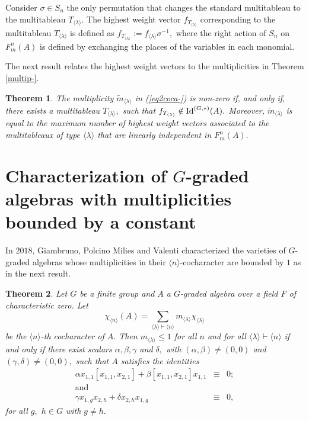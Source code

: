\documentclass{amsart}
\newcommand{\IdG}{\ensuremath{\textnormal{Id}^{(G,\ast)}}}
\newtheorem{teorema}{Theorem}[section]
\numberwithin{equation}{section}
\begin{document}
Consider $\sigma \in S_n$ the only permutation that changes the standard
multitableau to the multitableau $T_{\langle \lambda \rangle}.$ The highest weight vector $f_{T_{\langle \lambda \rangle}}$ corresponding to the multitableau
$T_{\langle \lambda \rangle}$ is defined as
$f_{T_{\langle \lambda \rangle}}:= f_{{\langle \lambda \rangle}}\sigma^{-1},$  
where the right action of $S_n$ on $F^n_m(A)$ is defined by exchanging the places of the variables in each monomial.   

The next result relates the highest weight vectors  to the multiplicities in Theorem \ref{multip-}. 

\begin{teorema}\label{multiplicity-}
	The multiplicity $\tilde{m}_{\langle \lambda \rangle}$ in (\ref{eq2coca-}) is non-zero if, and only if, there exists a multitableau $T_{\langle \lambda \rangle},$ such that $f_{T_{\langle \lambda \rangle}} \notin \IdG(A).$ 
	Moreover, $\tilde{m}_{\langle \lambda \rangle}$ is equal to the maximum number of highest weight vectors  associated to the multitableaux of type $\langle \lambda \rangle$ that are linearly independent in $F_{m}^n(A).$ %
	
\end{teorema} 



    
\section{Characterization of $G$-graded algebras with multiplicities bounded by a constant}

\hspace{0.6cm} In $2018$, Giambruno, Polcino Milies and Valenti \cite{GPV} characterized the varieties of $G$-graded algebras whose multiplicities in their $\langle n \rangle$-cocharacter are bounded by $1$ as in the next result.

\begin{teorema}\cite{GPV} Let $G$ be a finite group and $A$ a $G$-graded algebra over a field $F$ of characteristic zero. Let  $$\chi_{\langle n \rangle}(A) =\sum\limits_{\langle \lambda \rangle \vdash \langle n \rangle}m_{\langle \lambda \rangle}\chi_{\langle \lambda \rangle}$$ be the  $\langle n \rangle$-th cocharacter of $A.$ Then $m_{\langle \lambda \rangle} \le 1$ for all $n$ and for all $\langle \lambda \rangle \vdash \langle n \rangle$ if and only if there exist scalars $\alpha, \beta, \gamma$ and $\delta ,$ with $(\alpha,\beta)\neq(0,0)$ and $(\gamma, \delta)\neq (0,0),$ such that 
$A$ satisfies the identities
$$\begin{array}{cccc} \alpha x_{1,1}[x_{1,1}, x_{2,1}]+\beta[x_{1,1},x_{2,1}]x_{1,1} & \equiv & 0; \\ \mbox{and}\\ \gamma x_{1,g}x_{2,h}+\delta x_{2,h}x_{1,g} & \equiv & 0,
		
	\end{array}$$
for all $g,$ $h \in G$ with $g \neq h.$
\end{teorema}
\end{document}
